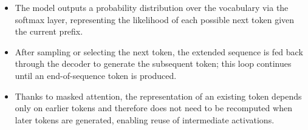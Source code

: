 \documentclass[11pt,a4paper]{article}
\theoremstyle{definition}
\theoremstyle{plain}
\theoremstyle{remark}
\begin{document}
\begin{itemize}
    \item The model outputs a probability distribution over the vocabulary via the softmax layer, representing the likelihood of each possible next token given the current prefix.
    \item After sampling or selecting the next token, the extended sequence is fed back through the decoder to generate the subsequent token; this loop continues until an end-of-sequence token is produced.
    \item Thanks to masked attention, the representation of an existing token depends only on earlier tokens and therefore does not need to be recomputed when later tokens are generated, enabling reuse of intermediate activations.
\end{itemize}
\end{document}
